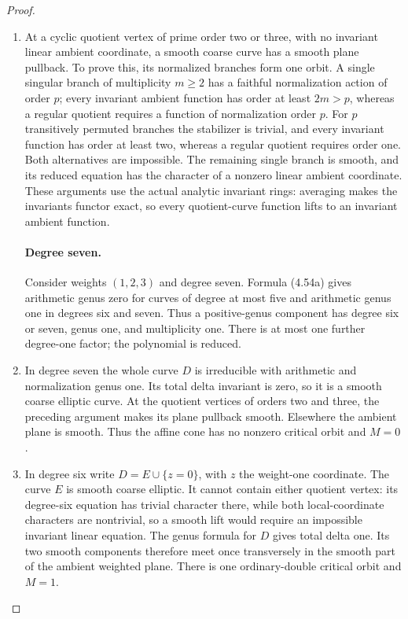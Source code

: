 \begin{proof}
\begin{enumerate}[label={$\langle1\rangle$\arabic*.},leftmargin=*]
\item At a cyclic quotient vertex of prime order two
or three, with no invariant linear ambient
coordinate, a smooth coarse curve has a smooth
plane pullback. To prove this, its normalized
branches form one orbit. A single singular
branch of multiplicity $m\ge2$ has a faithful
normalization action of order $p$; every invariant
ambient function has order at least $2m>p$,
whereas a regular quotient requires a function
of normalization order $p$. For $p$ transitively
permuted branches the stabilizer is trivial,
and every invariant function has order at least
two, whereas a regular quotient requires order
one. Both alternatives are impossible. The
remaining single branch is smooth, and its
reduced equation has the character of a nonzero
linear ambient coordinate. These arguments
use the actual analytic invariant rings:
averaging makes the invariants functor exact,
so every quotient-curve function lifts to an
invariant ambient function.

\paragraph{Degree seven.}
Consider weights $(1,2,3)$ and degree seven.
Formula (4.54a) gives arithmetic genus zero for
curves of degree at most five and arithmetic
genus one in degrees six and seven. Thus a
positive-genus component has degree six or
seven, genus one, and multiplicity one. There
is at most one further degree-one factor;
the polynomial is reduced.

\item In degree seven the whole curve $D$ is
irreducible with arithmetic and normalization
genus one. Its total delta invariant is zero,
so it is a smooth coarse elliptic curve.
At the quotient vertices of orders two and
three, the preceding argument makes its plane
pullback smooth. Elsewhere the ambient plane
is smooth. Thus the affine cone has no
nonzero critical orbit and $M=0$.

\item In degree six write $D=E\cup\{z=0\}$, with
$z$ the weight-one coordinate. The curve $E$
is smooth coarse elliptic. It cannot contain
either quotient vertex: its degree-six
equation has trivial character there, while
both local-coordinate characters are
nontrivial, so a smooth lift would require
an impossible invariant linear equation.
The genus formula for $D$ gives total delta
one. Its two smooth components therefore
meet once transversely in the smooth part
of the ambient weighted plane. There is
one ordinary-double critical orbit and
$M=1$.


\end{enumerate}
\end{proof}
